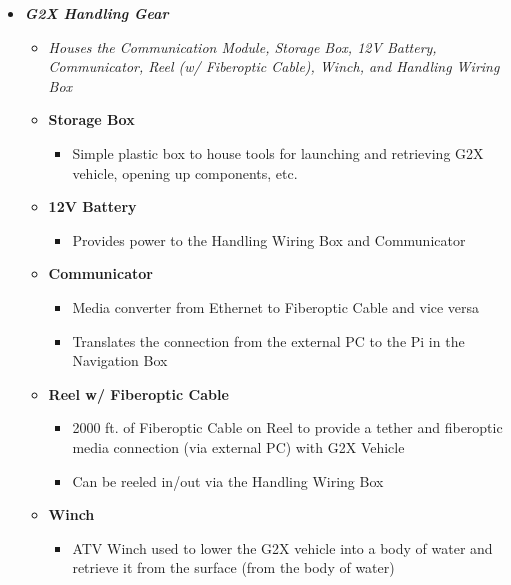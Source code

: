 \documentclass[12pt]{article}
\begin{document}
{{\begin{itemize}
\begin{itemize}
					\item[] \textbf{Buoyancy Foam}
					\begin{itemize}
						\item Machinable, hydrostatic pressure-resistant foams that provide buoyancy underwater\\\\
					\end{itemize}
				\end{itemize}
				\item \textbf{\textit{G2X Handling Gear}}
				\begin{itemize}	
					\item[] \textit{Houses the Communication Module, Storage Box, 12V Battery, Communicator, Reel (w/ Fiberoptic Cable), Winch, and Handling Wiring Box\\}
					\item[] \textbf{Storage Box}
					\begin{itemize}
						\item Simple plastic box to house tools for launching and retrieving G2X vehicle, opening up components, etc.
					\end{itemize}
					\item[] \textbf{12V Battery}
					\begin{itemize}
						\item Provides power to the Handling Wiring Box and Communicator
					\end{itemize}
					\item[] \textbf{Communicator}
					\begin{itemize}
						\item Media converter from Ethernet to Fiberoptic Cable and vice versa
						\item Translates the connection from the external PC to the Pi in the Navigation Box
					\end{itemize}
					\item[] \textbf{Reel w/ Fiberoptic Cable}
					\begin{itemize}
						\item 2000 ft. of Fiberoptic Cable on Reel to provide a tether and fiberoptic media connection (via external PC) with G2X Vehicle
						\item Can be reeled in/out via the Handling Wiring Box
					\end{itemize}
					\item[] \textbf{Winch}
					\begin{itemize}
						\item ATV Winch used to lower the G2X vehicle into a body of water and retrieve it from the surface (from the body of water)

\end{itemize}
\end{itemize}
\end{itemize}}}
\end{document}
